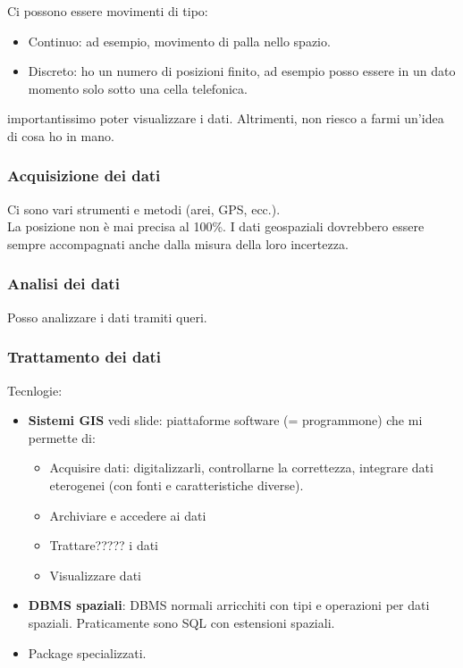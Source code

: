 \documentclass[a4paper,12pt]{article}
\begin{document}
Ci possono essere movimenti di tipo:
\begin{itemize}
\item Continuo: ad esempio, movimento di palla nello spazio.
\item Discreto: ho un numero di posizioni finito, ad esempio posso essere in un dato momento solo sotto una cella telefonica.
\end{itemize}

\E importantissimo poter visualizzare i dati. Altrimenti, non riesco a farmi un'idea di cosa ho in mano.

\subsubsection{Acquisizione dei dati}
Ci sono vari strumenti e metodi (arei, GPS, ecc.).\\
La posizione non è mai precisa al 100\%. I dati geospaziali dovrebbero essere sempre accompagnati anche dalla misura della loro incertezza.
\subsubsection{Analisi dei dati}
Posso analizzare i dati tramiti queri.
\subsubsection{Trattamento dei dati}
Tecnlogie:
\begin{itemize}
\item \textbf{Sistemi GIS} vedi slide: piattaforme software (= programmone) che mi permette di:
	\begin{itemize}
		\item Acquisire dati: digitalizzarli, controllarne la correttezza, integrare dati eterogenei (con fonti e caratteristiche diverse).
		\item Archiviare e accedere ai dati
		\item Trattare????? i dati
		\item Visualizzare dati
	\end{itemize}
\item \textbf{DBMS spaziali}: DBMS normali arricchiti con tipi e operazioni per dati spaziali. Praticamente sono SQL con estensioni spaziali.
	
\item Package specializzati.
\end{itemize}



\end{document}
